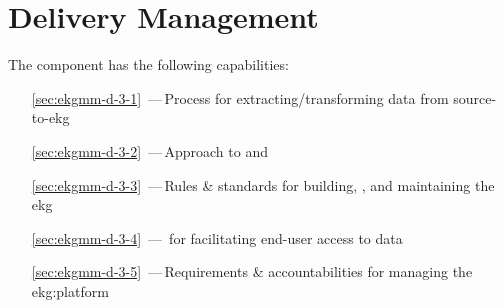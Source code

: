 \chapter{ Delivery Management}\label{ch:ekg-mm-d-3}

The  component has the following capabilities:

\begin{itemize}[leftmargin=.5in]
  \item [\ref{sec:ekgmm-d-3-1}] \,---\,Process for extracting/transforming data from source-to-\gls{ekg}
  \item [\ref{sec:ekgmm-d-3-2}] \,---\,Approach to  and 
  \item [\ref{sec:ekgmm-d-3-3}] \,---\,Rules \& standards for building, , and maintaining the \gls{ekg}
  \item [\ref{sec:ekgmm-d-3-4}] \,---\, for facilitating end-user access to data
  \item [\ref{sec:ekgmm-d-3-5}] \,---\,Requirements \& accountabilities for managing the \gls{ekg:platform}
\end{itemize}








